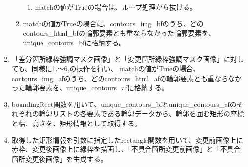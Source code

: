 \begin{enumerate}
\begin{enumerate}
\begin{enumerate}
                        \item matchの値がTrueの場合は、ループ処理から抜ける。
                    \end{enumerate}
              \item matchの値がTrueの場合に、contours\_img\_bfのうち、どのcontours\_html\_bfの輪郭要素とも重ならなかった輪郭要素を、unique\_contours\_bfに格納する。
          \end{enumerate}
    \item 「差分箇所緑枠強調マスク画像」と「変更箇所緑枠強調マスク画像」に対しても、同様に1.～6.の操作を行い、
          matchの値がTrueの場合、contours\_img\_afのうち、どのcontours\_html\_afの輪郭要素とも重ならなかった輪郭要素を、unique\_contours\_afに格納する。
    \item boundingRect関数を用いて、unique\_contours\_bfとunique\_contours\_afのそれぞれの輪郭リストの各要素である輪郭データから、輪郭を囲む矩形の座標と幅、高さを、矩形情報として取得する。
    \item 取得した矩形情報を引数に指定したrectangle関数を用いて、変更前画像上に赤枠、変更後画像上に緑枠を描画し、「不具合箇所変更前画像」と「不具合箇所変更後画像」を生成する。
\end{enumerate}

